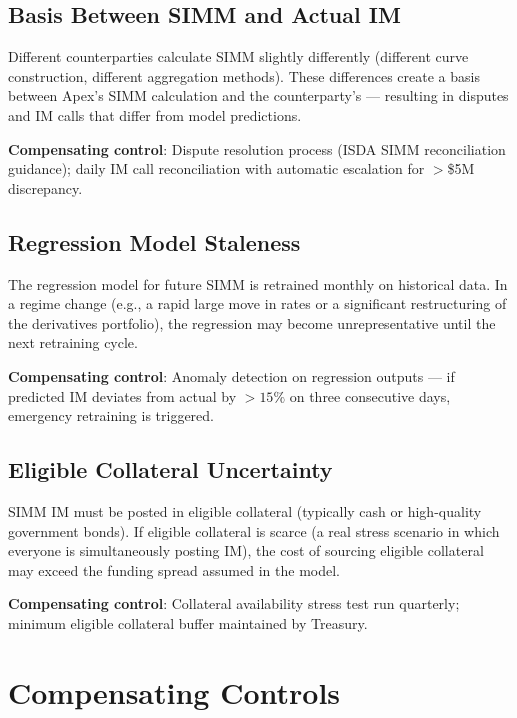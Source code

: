 \documentclass[11pt,a4paper]{article}
\begin{document}
\subsection{Basis Between SIMM and Actual IM}

Different counterparties calculate SIMM slightly differently (different curve construction,
different aggregation methods). These differences create a basis between Apex's SIMM calculation
and the counterparty's --- resulting in disputes and IM calls that differ from model predictions.

\textbf{Compensating control}: Dispute resolution process (ISDA SIMM reconciliation guidance);
daily IM call reconciliation with automatic escalation for $>$\$5M discrepancy.

\subsection{Regression Model Staleness}

The regression model for future SIMM is retrained monthly on historical data. In a regime change
(e.g., a rapid large move in rates or a significant restructuring of the derivatives portfolio),
the regression may become unrepresentative until the next retraining cycle.

\textbf{Compensating control}: Anomaly detection on regression outputs --- if predicted IM
deviates from actual by $>15\%$ on three consecutive days, emergency retraining is triggered.

\subsection{Eligible Collateral Uncertainty}

SIMM IM must be posted in eligible collateral (typically cash or high-quality government bonds).
If eligible collateral is scarce (a real stress scenario in which everyone is simultaneously
posting IM), the cost of sourcing eligible collateral may exceed the funding spread assumed in
the model.

\textbf{Compensating control}: Collateral availability stress test run quarterly; minimum
eligible collateral buffer maintained by Treasury.

\section{Compensating Controls}
\end{document}
